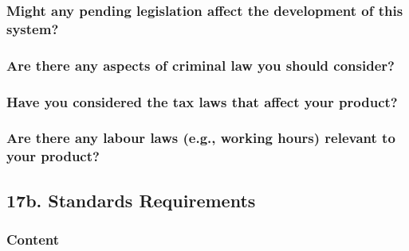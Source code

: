\documentclass[
]{article}
\begin{document}
\hypertarget{might-any-pending-legislation-affect-the-development-of-this-system}{%
\subsubsection{Might any pending legislation affect the development of
this
system?}\label{might-any-pending-legislation-affect-the-development-of-this-system}}

\hypertarget{are-there-any-aspects-of-criminal-law-you-should-consider}{%
\subsubsection{Are there any aspects of criminal law you should
consider?}\label{are-there-any-aspects-of-criminal-law-you-should-consider}}

\hypertarget{have-you-considered-the-tax-laws-that-affect-your-product}{%
\subsubsection{Have you considered the tax laws that affect your
product?}\label{have-you-considered-the-tax-laws-that-affect-your-product}}

\hypertarget{are-there-any-labour-laws-e.g.-working-hours-relevant-to-your-product}{%
\subsubsection{Are there any labour laws (e.g., working hours) relevant
to your
product?}\label{are-there-any-labour-laws-e.g.-working-hours-relevant-to-your-product}}

\hypertarget{b.-standards-requirements}{%
\subsection{17b. Standards
Requirements}\label{b.-standards-requirements}}

\hypertarget{content-59}{%
\subsubsection{Content}\label{content-59}}
\end{document}
